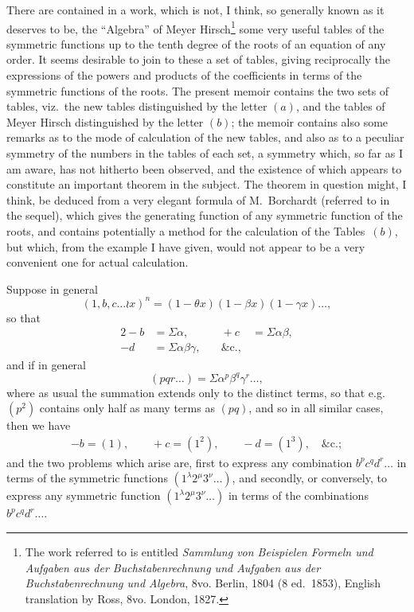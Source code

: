 \documentclass[11pt,a4paper]{book}
\begin{document}
\begin{center}
\normalsize
\setcounter{footnote}{0}

There are contained in a work, which is not, I think, so generally known
as it deserves to be, the ``Algebra'' of Meyer Hirsch\footnote{The work
referred to is entitled \textit{Sammlung von Beispielen Formeln und Aufgaben
aus der Buchstabenrechnung und Aufgaben aus der Buchstabenrechnung und
Algebra}, 8vo. Berlin, 1804 (8 ed.~1853), English translation by Ross, 8vo.
London, 1827.} some very useful tables of the symmetric functions up to the
tenth degree of the roots of an equation of any order. It seems desirable to
join to these a set of tables, giving reciprocally the expressions of the
powers and products of the coefficients in terms of the symmetric functions of
the roots. The present memoir contains the two sets of tables, viz.\ the new
tables distinguished by the letter $(a)$, and the tables of Meyer Hirsch
distinguished by the letter $(b)$; the memoir contains also some remarks as to
the mode of calculation of the new tables, and also as to a peculiar symmetry
of the numbers in the tables of each set, a symmetry which, so far as I am
aware, has not hitherto been observed, and the existence of which appears to
constitute an important theorem in the subject. The theorem in question might,
I think, be deduced from a very elegant formula of M.~Borchardt (referred to in
the sequel), which gives the generating function of any symmetric function of
the roots, and contains potentially a method for the calculation of the
Tables~$(b)$, but which, from the example I have given, would not appear to be
a very convenient one for actual calculation.

Suppose in general
\[
(1, b, c \ldots \wr x)^n = (1 - \theta x)(1 - \beta x)(1 - \gamma x)\ldots,
\]
so that
\begin{alignat*}{2}
-b &= \Sigma\alpha, &\quad +c &= \Sigma\alpha\beta, \\
-d &= \Sigma\alpha\beta\gamma, &\quad \&\text{c.},
\end{alignat*}
and if in general
\[
(pqr\ldots) = \Sigma\alpha^p \beta^q \gamma^r \ldots,
\]
where as usual the summation extends only to the distinct terms, so that
e.g.\ $(p^2)$ contains only half as many terms as $(pq)$, and so in all
similar cases, then we have
\begin{gather*}
-b = (1), \qquad +c = (1^2), \qquad -d = (1^3), \quad \&\text{c.};
\end{gather*}
and the two problems which arise are, first to express any combination
$b^p c^q d^r \ldots$ in terms of the symmetric functions
$(1^{\lambda} 2^{\mu} 3^{\nu}\ldots)$, and secondly, or conversely, to express any
symmetric function $(1^{\lambda} 2^{\mu} 3^{\nu}\ldots)$ in terms of the
combinations $b^p c^q d^r \ldots$.


\end{center}
\end{document}
